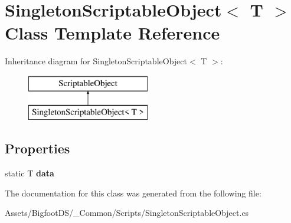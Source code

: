 \hypertarget{class_singleton_scriptable_object}{}\section{Singleton\+Scriptable\+Object$<$ T $>$ Class Template Reference}
\label{class_singleton_scriptable_object}
Inheritance diagram for Singleton\+Scriptable\+Object$<$ T $>$\+:\begin{figure}[H]
\begin{center}
\leavevmode
\includegraphics[height=2.000000cm]{class_singleton_scriptable_object}
\end{center}
\end{figure}
\subsection*{Properties}
\begin{DoxyCompactItemize}
\item 
\mbox{\label{class_singleton_scriptable_object_ab7d1b120991063507e31e1925880ac43}} 
static T {\bfseries data}
\end{DoxyCompactItemize}


The documentation for this class was generated from the following file\+:\begin{DoxyCompactItemize}
\item 
Assets/\+Bigfoot\+D\+S/\+\_\+\+Common/\+Scripts/Singleton\+Scriptable\+Object.\+cs\end{DoxyCompactItemize}
